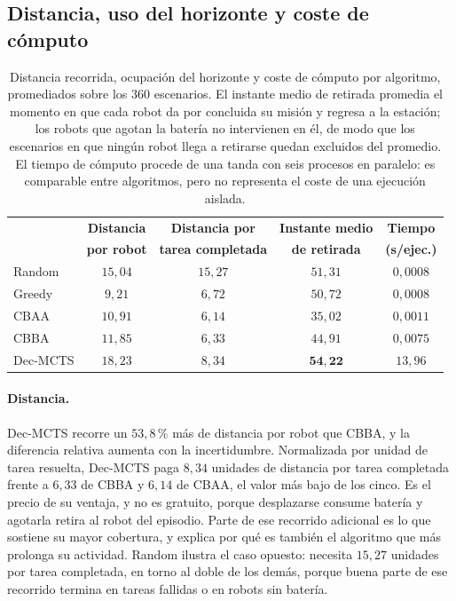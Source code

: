 \subsection{Distancia, uso del horizonte y coste de cómputo} \label{subsec:exp-coste}

\begin{table}[t]
\centering
\caption{Distancia recorrida, ocupación del horizonte y coste de cómputo por algoritmo, promediados sobre los $360$ escenarios. El instante medio de retirada promedia el momento en que cada robot da por concluida su misión y regresa a la estación; los robots que agotan la batería no intervienen en él, de modo que los escenarios en que ningún robot llega a retirarse quedan excluidos del promedio. El tiempo de cómputo procede de una tanda con seis procesos en paralelo: es comparable entre algoritmos, pero no representa el coste de una ejecución aislada.}
\label{tab:res-secundarias}
\small
\setlength{\tabcolsep}{6pt}
\begin{tabular}{lcccc}
\hline
 & \textbf{Distancia} & \textbf{Distancia por} & \textbf{Instante medio} & \textbf{Tiempo} \\
 & \textbf{por robot} & \textbf{tarea completada} & \textbf{de retirada} & \textbf{(s/ejec.)} \\
\hline
Random    & $15{,}04$ & $15{,}27$ & $51{,}31$ & $0{,}0008$ \\
Greedy    & $9{,}21$  & $6{,}72$  & $50{,}72$ & $0{,}0008$ \\
CBAA      & $10{,}91$ & $6{,}14$  & $35{,}02$ & $0{,}0011$ \\
CBBA      & $11{,}85$ & $6{,}33$  & $44{,}91$ & $0{,}0075$ \\
Dec-MCTS  & $18{,}23$ & $8{,}34$  & $\mathbf{54{,}22}$ & $13{,}96$ \\
\hline
\end{tabular}
\end{table}

\paragraph{Distancia.} Dec-MCTS recorre un $53{,}8\,\text{\%}$ más de distancia por robot que CBBA, y la diferencia relativa aumenta con la incertidumbre. Normalizada por unidad de tarea resuelta, Dec-MCTS paga $8{,}34$ unidades de distancia por tarea completada frente a $6{,}33$ de CBBA y $6{,}14$ de CBAA, el valor más bajo de los cinco. Es el precio de su ventaja, y no es gratuito, porque desplazarse consume batería y agotarla retira al robot del episodio. Parte de ese recorrido adicional es lo que sostiene su mayor cobertura, y explica por qué es también el algoritmo que más prolonga su actividad. Random ilustra el caso opuesto: necesita $15{,}27$ unidades por tarea completada, en torno al doble de los demás, porque buena parte de ese recorrido termina en tareas fallidas o en robots sin batería.

